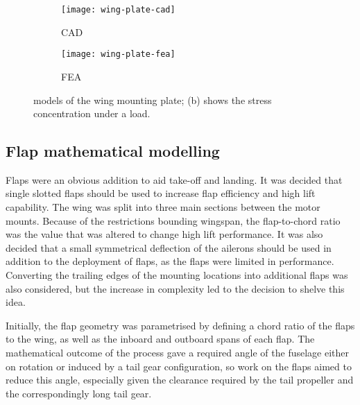 \documentclass[../../main.tex]{subfiles}
\begin{document}

\begin{figure}[H]

    \centering
    \begin{subfigure}[b]{0.49\columnwidth}
        \centering
        \texttt{[image: wing-plate-cad]}
        \caption{CAD}
        \label{fig:wing-plate:cad}
    \end{subfigure}
    \hfill
    \begin{subfigure}[b]{0.49\columnwidth}
        \centering
        \texttt{[image: wing-plate-fea]}
        \caption{FEA}
        \label{fig:wing-plate:fea}
    \end{subfigure}
    
    \caption{
        models of the wing mounting plate; (b) shows the stress concentration under a  load.
    }
    \label{fig:wing-plate}
\end{figure}

\subsection{Flap mathematical modelling} \label{sec:final-design-proposal:wing:flap-mathematical-modelling}


Flaps were an obvious addition to aid take-off and landing.
It was decided that single slotted flaps should be used to increase flap efficiency and high lift capability.
The wing was split into three main sections between the motor mounts.
Because of the restrictions bounding wingspan, the flap-to-chord ratio was the value that was altered to change high lift performance.
It was also decided that a small symmetrical deflection of the ailerons should be used in addition to the deployment of flaps, as the flaps were limited in performance.
Converting the trailing edges of the mounting locations into additional flaps was also considered, but the increase in complexity led to the decision to shelve this idea. 

Initially, the flap geometry was parametrised by defining a chord ratio of the flaps to the wing, as well as the inboard and outboard spans of each flap.
The mathematical outcome of the process gave a required angle of the fuselage either on rotation or induced by a tail gear configuration, so work on the flaps aimed to reduce this angle, especially given the clearance required by the tail propeller and the correspondingly long tail gear. 
\end{document}
